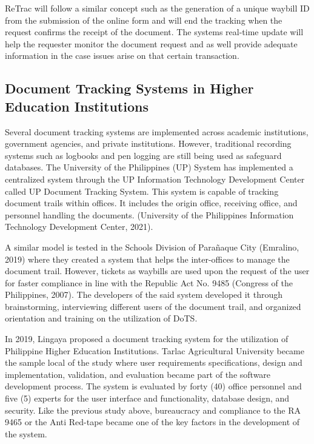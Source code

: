 ReTrac will follow a similar concept such as the generation of a unique waybill ID from the submission of the online form and will end the tracking when the request confirms the receipt of the document. The system\textsc{}s real-time update will help the requester monitor the document request and as well provide adequate information in the case issues arise on that certain transaction. 

\subsection{Document Tracking Systems in Higher Education Institutions}

Several document tracking systems are implemented across academic institutions, government agencies, and private institutions. However, traditional recording systems such as logbooks and pen logging are still being used as safeguard databases. The University of the Philippines (UP)  System has implemented a centralized system through the UP Information Technology Development Center called UP Document Tracking System.  This system is capable of tracking document trails within offices. It includes the origin office, receiving office, and personnel handling the documents. (University of the Philippines Information Technology Development Center, 2021). 

A similar model is tested in the Schools Division of Parañaque City (Emralino, 2019) where they created a system that helps the inter-offices to manage the document trail. However, tickets as waybills are used upon the request of the user for faster compliance in line with the Republic Act No. 9485 (Congress of the Philippines, 2007). The developers of the said system developed it through brainstorming, interviewing different users of the document trail, and organized orientation and training on the utilization of DoTS. 

In 2019, Lingaya proposed a document tracking system for the utilization of Philippine Higher Education Institutions. Tarlac Agricultural University became the sample local of the study where user requirements specifications, design and implementation, validation, and evaluation became part of the software development process. The system is evaluated by forty (40) office personnel and five (5) experts for the user interface and functionality, database design, and security. Like the previous study above, bureaucracy and compliance to the RA 9465 or the Anti Red-tape became one of the key factors in the development of the system. 

